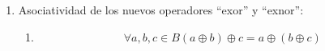 \begin{enumerate}
\begin{enumerate}
\begin{enumerate}
      \begin{enumerate}
      \def\labelenumiv{\arabic{enumiv}.}
      \tightlist
      \item
        \[\forall a,{b \in B}{{\bar{a\oplus b} \equiv \overline{a\oplus b}} = \overline{a}} \oplus {b = a} \oplus {\overline{b} = a} \odot b\]
      \item
        \[\forall a,{b \in B}{{\bar{a\odot b} \equiv \overline{a\odot b}} = \overline{a}} \odot {b = a} \odot {\overline{b} = a} \oplus b\]
      \end{enumerate}
    \item
      Asociatividad de los nuevos operadores ``exor'' y ``exnor'':

      \begin{enumerate}
      \def\labelenumiv{\arabic{enumiv}.}
      \item
        \[\forall a,b,{c \in B}{({a \oplus b})} \oplus {c = a} \oplus {({b \oplus c})}\]


\end{enumerate}
\end{enumerate}
\end{enumerate}
\end{enumerate}

